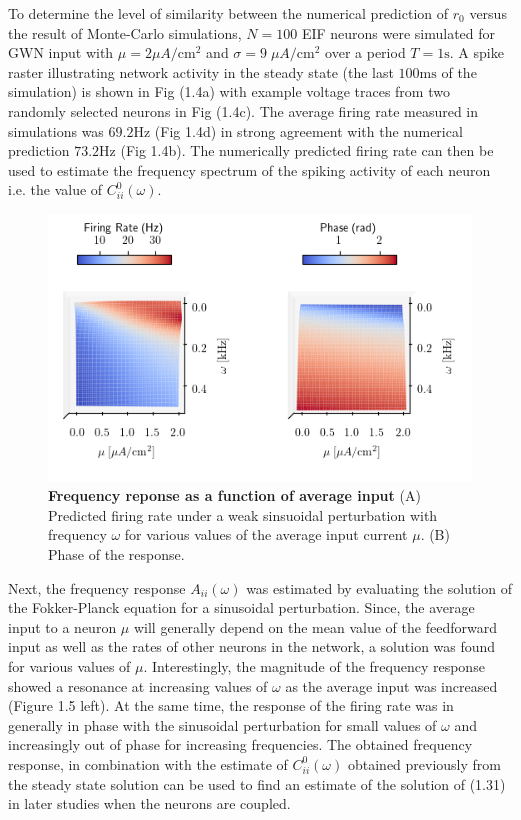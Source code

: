 \documentclass{ucetd}
\begin{document}
To determine the level of similarity between the numerical prediction of $r_{0}$ versus the result of Monte-Carlo simulations, $N=100$ EIF neurons were simulated for GWN input with $\mu = 2\mu A/\mathrm{cm}^{2}$ and $\sigma = 9 \;\mu A/\mathrm{cm}^{2}$ over a period $T = 1\mathrm{s}$. A spike raster illustrating network activity in the steady state (the last $100\mathrm{ms}$ of the simulation) is shown in Fig (1.4a) with example voltage traces from two randomly selected neurons in Fig (1.4c). The average firing rate measured in simulations was $69.2\mathrm{Hz}$ (Fig 1.4d) in strong agreement with the numerical prediction $73.2\mathrm{Hz}$ (Fig 1.4b). The numerically predicted firing rate can then be used to estimate the frequency spectrum of the spiking activity of each neuron i.e. the value of $C_{ii}^{0}(\omega)$. 

\begin{figure}[t!]
\centering
\includegraphics[width=150mm]{figure-4}
\caption{\textbf{Frequency reponse as a function of average input} (A) Predicted firing rate under a weak sinsuoidal perturbation with frequency $\omega$ for various values of the average input current $\mu$. (B) Phase of the response. }
\end{figure}


Next, the frequency response $A_{ii}(\omega)$ was estimated by evaluating the solution of the Fokker-Planck equation for a sinusoidal perturbation. Since, the average input to a neuron $\mu$ will generally depend on the mean value of the feedforward input as well as the rates of other neurons in the network, a solution was found for various values of $\mu$. Interestingly, the magnitude of the frequency response showed a resonance at increasing values of $\omega$ as the average input was increased (Figure 1.5 left). At the same time, the response of the firing rate was in generally in phase with the sinusoidal perturbation for small values of $\omega$ and increasingly out of phase for increasing frequencies. The obtained frequency response, in combination with the estimate of $C_{ii}^{0}(\omega)$ obtained previously from the steady state solution can be used to find an estimate of the solution of (1.31) in later studies when the neurons are coupled.
\end{document}
